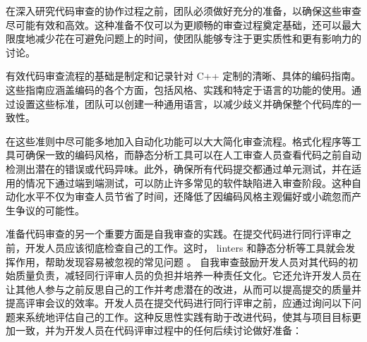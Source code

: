 

在深入研究代码审查的协作过程之前，团队必须做好充分的准备，以确保这些审查尽可能有效和高效。这种准备不仅可以为更顺畅的审查过程奠定基础，还可以最大限度地减少花在可避免问题上的时间，使团队能够专注于更实质性和更有影响力的讨论。


有效代码审查流程的基础是制定和记录针对 C++ 定制的清晰、具体的编码指南。这些指南应涵盖编码的各个方面，包括风格、实践和特定于语言的功能的使用。通过设置这些标准，团队可以创建一种通用语言，以减少歧义并确保整个代码库的一致性。

在这些准则中尽可能多地加入自动化功能可以大大简化审查流程。格式化程序等工具可确保一致的编码风格，而静态分析工具可以在人工审查人员查看代码之前自动检测出潜在的错误或代码异味。此外，确保所有代码提交都通过单元测试，并在适用的情况下通过端到端测试，可以防止许多常见的软件缺陷进入审查阶段。这种自动化水平不仅为审查人员节省了时间，还降低了因编码风格主观偏好或小疏忽而产生争议的可能性。


准备代码审查的另一个重要方面是自我审查的实践。在提交代码进行同行评审之前，开发人员应该彻底检查自己的工作。这时， linters 和静态分析等工具就会发挥作用，帮助发现容易被忽视的常见问题
。
自我审查鼓励开发人员对其代码的初始质量负责，减轻同行评审人员的负担并培养一种责任文化。它还允许开发人员在让其他人参与之前反思自己的工作并考虑潜在的改进，从而可以提高提交的质量并提高评审会议的效率。开发人员在提交代码进行同行评审之前，应通过询问以下问题来系统地评估自己的工作。这种反思性实践有助于改进代码，使其与项目目标更加一致，并为开发人员在代码评审过程中的任何后续讨论做好准备：

